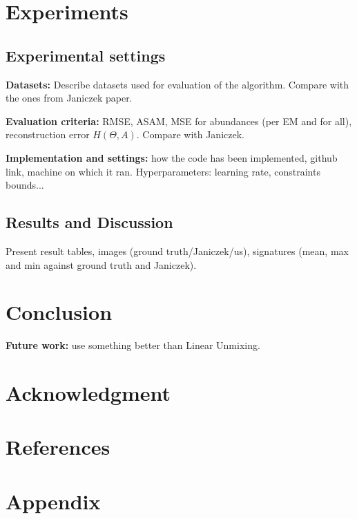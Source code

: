 \documentclass[conference]{IEEEtran}
\begin{document}
\section{Experiments}
\subsection{Experimental settings}
\textbf{Datasets:} Describe datasets used for evaluation of the algorithm. Compare with the ones from Janiczek paper.

\textbf{Evaluation criteria:} RMSE, ASAM, MSE for abundances (per EM and for all), reconstruction error $H(\Theta, A)$. Compare with Janiczek.

\textbf{Implementation and settings:} how the code has been implemented, github link, machine on which it ran. Hyperparameters: learning rate, constraints bounds...

\subsection{Results and Discussion}
Present result tables, images (ground truth/Janiczek/us), signatures (mean, max and min against ground truth and Janiczek).


\section{Conclusion}
\textbf{Future work:} use something better than Linear Unmixing.

\section*{Acknowledgment}


\section*{References}




\section{Appendix}
\end{document}

